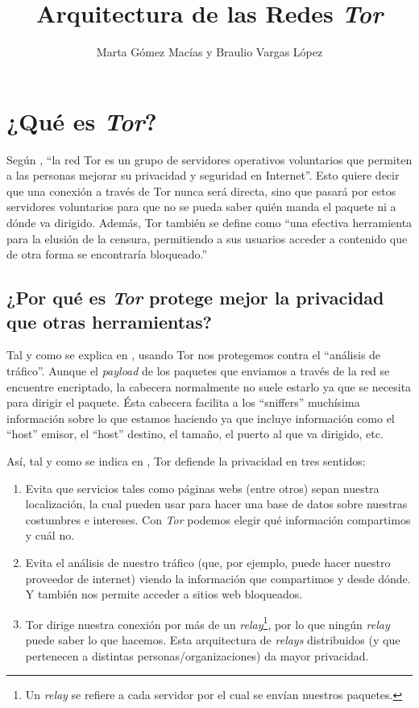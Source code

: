 \documentclass[10pt,a4paper,spanish]{article}
\title{\Huge Arquitectura de las Redes \textit{Tor}}
\author{\Large Marta Gómez Macías y Braulio Vargas López}
\begin{document}
\renewcommand{\tablename}{Tabla}
\maketitle

\tableofcontents

\section{¿Qué es \textit{Tor}?}
Según \cite{deftor}, ``la red Tor es un grupo de servidores operativos voluntarios que permiten a las personas mejorar su privacidad y seguridad en Internet''. Esto quiere decir que una conexión a través de Tor nunca será directa, sino que pasará por estos servidores voluntarios para que no se pueda saber quién manda el paquete ni a dónde va dirigido. Además, Tor también se define como ``una efectiva herramienta para la elusión de la censura, permitiendo a sus usuarios acceder a contenido que de otra forma se encontraría bloqueado.''

\subsection{¿Por qué es \textit{Tor} protege mejor la privacidad que otras herramientas?}
Tal y como se explica en \cite{deftor}, usando Tor nos protegemos contra el ``análisis de tráfico''. Aunque el \textit{payload} de los paquetes que enviamos a través de la red se encuentre encriptado, la cabecera normalmente no suele estarlo ya que se necesita para dirigir el paquete. Ésta cabecera facilita a los ``sniffers'' muchísima información sobre lo que estamos haciendo ya que incluye información como el ``host'' emisor, el ``host'' destino, el tamaño, el puerto al que va dirigido, etc.

Así, tal y como se indica en \cite{protectionstor}, Tor defiende la privacidad en tres sentidos:
\begin{enumerate}[$\bullet$]
    \item Evita que servicios tales como páginas webs (entre otros) sepan nuestra localización, la cual pueden usar para hacer una base de datos sobre nuestras costumbres e intereses. Con \textit{Tor} podemos elegir qué información compartimos y cuál no.
    \item Evita el análisis de nuestro tráfico (que, por ejemplo, puede hacer nuestro proveedor de internet) viendo la información que compartimos y desde dónde. Y también nos permite acceder a sitios web bloqueados.
    \item Tor dirige nuestra conexión por más de un \textit{relay}\footnote{Un \textit{relay} se refiere a cada servidor por el cual se envían nuestros paquetes.}, por lo que ningún \textit{relay} puede saber lo que hacemos. Esta arquitectura de \textit{relays} distribuidos (y que pertenecen a distintas personas/organizaciones) da mayor privacidad.
\end{enumerate}
\end{document}
